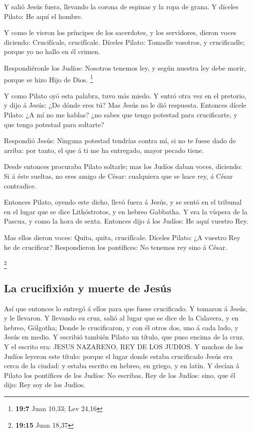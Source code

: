  Y salió Jesús fuera, llevando la corona de espinas y la
ropa de grana. Y díceles Pilato: He aquí el hombre.

 Y como le vieron los príncipes de los sacerdotes, y los
servidores, dieron voces diciendo: Crucifícale, crucifícale. Díceles
Pilato: Tomadle vosotros, y crucificadle; porque yo no hallo en él
crimen.

 Respondiéronle los Judíos: Nosotros tenemos ley, y según
nuestra ley debe morir, porque se hizo Hijo de Dios. \footnote{\textbf{19:7}
  Juan 10,33; Lev 24,16}

 Y como Pilato oyó esta palabra, tuvo más miedo.
 Y entró otra vez en el pretorio, y dijo á Jesús: ¿De dónde
eres tú? Mas Jesús no le dió respuesta.  Entonces dícele
Pilato: ¿A mí no me hablas? ¿no sabes que tengo potestad para
crucificarte, y que tengo potestad para soltarte?

 Respondió Jesús: Ninguna potestad tendrías contra mí, si
no te fuese dado de arriba: por tanto, el que á ti me ha entregado,
mayor pecado tiene.

 Desde entonces procuraba Pilato soltarle; mas los Judíos
daban voces, diciendo: Si á éste sueltas, no eres amigo de César:
cualquiera que se hace rey, á César contradice.

 Entonces Pilato, oyendo este dicho, llevó fuera á Jesús, y
se sentó en el tribunal en el lugar que se dice Lithóstrotos, y en
hebreo Gabbatha.  Y era la víspera de la Pascua, y como la
hora de sexta. Entonces dijo á los Judíos: He aquí vuestro Rey.

 Mas ellos dieron voces: Quita, quita, crucifícale. Díceles
Pilato: ¿A vuestro Rey he de crucificar? Respondieron los pontífices: No
tenemos rey sino á César.

\footnote{\textbf{19:15} Juan 18,37}

\hypertarget{la-crucifixiuxf3n-y-muerte-de-jesuxfas}{%
\subsection{La crucifixión y muerte de
Jesús}\label{la-crucifixiuxf3n-y-muerte-de-jesuxfas}}

 Así que entonces lo entregó á ellos para que fuese
crucificado. Y tomaron á Jesús, y le llevaron.  Y llevando
su cruz, salió al lugar que se dice de la Calavera, y en hebreo,
Gólgotha;  Donde le crucificaron, y con él otros dos, uno á
cada lado, y Jesús en medio.  Y escribió también Pilato un
título, que puso encima de la cruz. Y el escrito era: JESUS NAZARENO,
REY DE LOS JUDIOS.  Y muchos de los Judíos leyeron este
título: porque el lugar donde estaba crucificado Jesús era cerca de la
ciudad: y estaba escrito en hebreo, en griego, y en latín. 
Y decían á Pilato los pontífices de los Judíos: No escribas, Rey de los
Judíos: sino, que él dijo: Rey soy de los Judíos.

